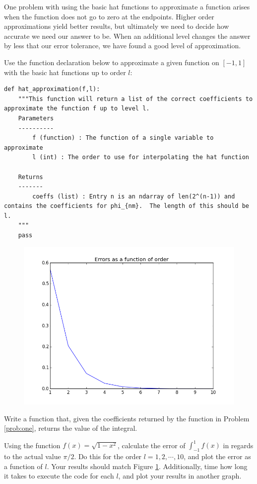 One problem with using the basic hat functions to approximate a function arises when the function does not go to zero at the endpoints.  Higher order approximations yield better results, but ultimately we need to decide how accurate we need our answer to be.  When an additional level changes the answer by less that our error tolerance, we have found a good level of approximation.

 \begin{problem}
Use the function declaration below to approximate a given function on $[-1,1]$ with the basic hat functions up to order $l$:
\begin{lstlisting}
def hat_approximation(f,l):
    """This function will return a list of the correct coefficients to approximate the function f up to level l.
    Parameters
    ----------
        f (function) : The function of a single variable to approximate
        l (int) : The order to use for interpolating the hat function

    Returns
    -------
        coeffs (list) : Entry n is an ndarray of len(2^(n-1)) and contains the coefficients for phi_{nm}.  The length of this should be l.
    """
    pass
\end{lstlisting}
\label{prob:one}
\end{problem}


\begin{center}
\begin{figure}
\includegraphics[width=.7\textwidth]{errors.png}
\caption{}
\label{fig:errors}
\end{figure}
\end{center}

\begin{problem}
Write a function that, given the coefficients returned by the function in Problem \ref{prob:one}, returns the value of the integral.

Using the function $f(x)=\sqrt{1-x^2}$, calculate the error of $\int_{-1}^1 f(x)$ in regards to the actual value $\pi/2$.  Do this for the order $l = 1,2,\cdots,10$, and plot the error as a function of $l$.  Your results should match Figure \ref{fig:errors}.  Additionally, time how long it takes to execute the code for each $l$, and plot your results in another graph.
\end{problem}

